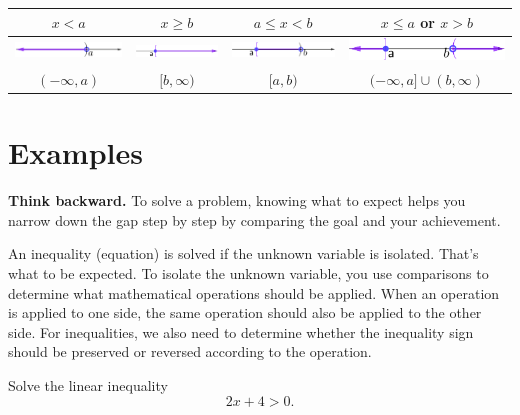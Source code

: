 \documentclass[en,11pt]{latex/elegantbookr}
\theoremstyle{definition}
\theoremstyle{definition}
\theoremstyle{definition}
\theoremstyle{remark}
\let\BeginKnitrBlock\begin \let\EndKnitrBlock\end
\begin{document}
\begin{longtable}[]{@{}cccc@{}}
\toprule
\(x<a\) & \(x\ge b\) & \(a\le x<b\) & \(x\le a\) or \(x>b\)\tabularnewline
\midrule
\endhead
\includegraphics{figs/Interval-number-line-less-than.png} & \includegraphics{figs/Interval-number-line-greater-than.png} & \includegraphics{figs/Interval-number-line-between.png} & \includegraphics{figs/Interval-number-line-beyond.png}\tabularnewline
\((-\infty, a)\) & \([b,\infty)\) & \([a, b)\) & \((-\infty, a]\cup (b,\infty)\)\tabularnewline
\bottomrule
\end{longtable}

\hypertarget{examples}{%
\section{Examples}\label{examples}}

\BeginKnitrBlock{rmdtip}
\textbf{Think backward.} To solve a problem, knowing what to expect helps you narrow down the gap step by step by comparing the goal and your achievement.

An inequality (equation) is solved if the unknown variable is isolated. That's what to be expected. To isolate the unknown variable, you use comparisons to determine what mathematical operations should be applied. When an operation is applied to one side, the same operation should also be applied to the other side. For inequalities, we also need to determine whether the inequality sign should be preserved or reversed according to the operation.
\EndKnitrBlock{rmdtip}

\BeginKnitrBlock{example}
\protect\hypertarget{exm:unnamed-chunk-6}{}{\label{exm:unnamed-chunk-6} }Solve the linear inequality
\[
2x+4>0.
\]
\EndKnitrBlock{example}
\end{document}

